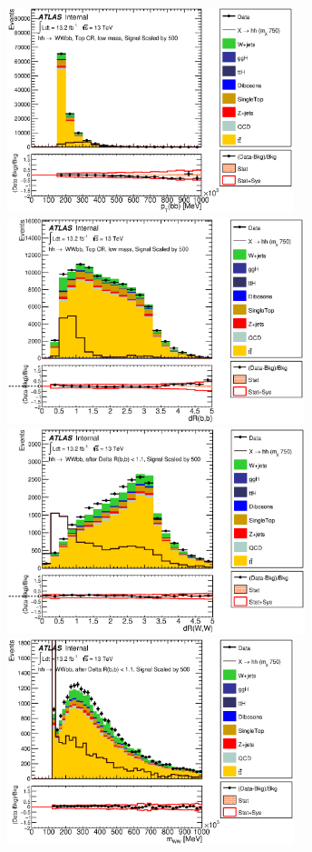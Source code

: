 \iffalse
\begin{figure}[!hb]
\begin{center}
		\includegraphics[height=60mm]{chapters/dihiggs/figures/ControlPlots/CR1/C_opt700_bbpt150_bbPt.eps} 
		\includegraphics[height=60mm]{chapters/dihiggs/figures/ControlPlots/CR1/C_opt700_bbpt150_drbb.eps} 
		\includegraphics[height=60mm]{chapters/dihiggs/figures/ControlPlots/CR1/C_opt700_bbpt150_drbb11_drww.eps}
		\includegraphics[height=60mm]{chapters/dihiggs/figures/ControlPlots/CR1/C_opt700_bbpt150_drbb11_WWMass.eps} 

\end{center}
\end{figure}
